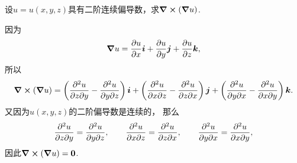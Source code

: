 \begin{example}
设\(u = u(x,y,z)\)具有二阶连续偏导数，求\(\curl(\grad u)\).
\begin{solution}
因为\[
	\grad u = \pdv{u}{x} \boldsymbol{i} + \pdv{u}{y} \boldsymbol{j} + \pdv{u}{z} \boldsymbol{k},
\]
所以\[
	\curl(\grad u)
	= \left( \pdv[2]{u}{z}{y} - \pdv[2]{u}{y}{z} \right) \boldsymbol{i}
	+ \left( \pdv[2]{u}{x}{z} - \pdv[2]{u}{z}{x} \right) \boldsymbol{j}
	+ \left( \pdv[2]{u}{y}{x} - \pdv[2]{u}{x}{y} \right) \boldsymbol{k}.
\]
又因为\(u(x,y,z)\)的二阶偏导数是连续的，
那么\[
	\pdv[2]{u}{z}{y} = \pdv[2]{u}{y}{z},
	\qquad
	\pdv[2]{u}{x}{z} = \pdv[2]{u}{z}{x},
	\qquad
	\pdv[2]{u}{y}{x} = \pdv[2]{u}{x}{y},
\]
因此\(\curl(\grad u) = \boldsymbol{0}\).
\end{solution}
\end{example}

